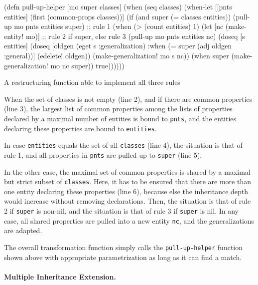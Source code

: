 \documentclass[submission]{eptcs}
\begin{document}
\begin{listing}[htbp]
  \begin{clojurecode}
(defn pull-up-helper [mo super classes]
  (when (seq classes)
    (when-let [[pnts entities] (first (common-props classes))]
      (if (and super (= classes entities))
        (pull-up mo pnts entities super)  ;; rule 1
        (when (> (count entities) 1)
          (let [nc (make-entity! mo)]     ;; rule 2 if super, else rule 3
            (pull-up mo pnts entities nc)
            (doseq [s entities]
              (doseq [oldgen (eget s :generalization)
                      :when (= super (adj oldgen :general))]
                (edelete! oldgen))
              (make-generalization! mo s nc))
            (when super (make-generalization! mo nc super))
            true))))))
  \end{clojurecode}
  \caption{A restructuring function able to implement all three rules}
  \label{lst:pull-up-helper}
\end{listing}

When the set of classes is not empty (line 2), and if there are common
properties (line 3), the largest list of common properties among the lists of
properties declared by a maximal number of entities is bound to \verb|pnts|,
and the entities declaring these properties are bound to \verb|entities|.

In case \verb|entities| equals the set of all \verb|classes| (line 4), the
situation is that of rule 1, and all properties in \verb|pnts| are pulled up to
\verb|super| (line 5).

In the other case, the maximal set of common properties is shared by a maximal
but strict subset of \verb|classes|.  Here, it has to be ensured that there are
more than one entity declaring these properties (line 6), because else the
inheritance depth would increase without removing declarations.  Then, the
situation is that of rule 2 if \verb|super| is non-nil, and the situation is
that of rule 3 if \verb|super| is nil.  In any case, all shared properties are
pulled into a new entity \verb|nc|, and the generalizations are adapted.

The overall transformation function simply calls the \verb|pull-up-helper|
function shown above with appropriate parametrization as long as it can find a
match.


\paragraph{Multiple Inheritance Extension.}
\end{document}
